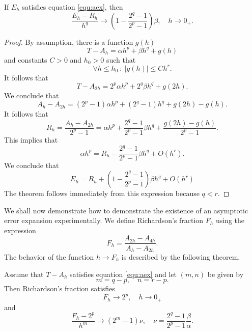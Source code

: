 \documentclass[runningheads]{llncs}
\begin{document}
\begin{theorem} If $E_h$ satisfies equation \eqref{equ:aex}, then
  \begin{equation}
    \frac{E_h - R_h}{h^q} \rightarrow  \left(1 - \frac{2^q-1}{2^p-1} \right) \beta, \quad h \rightarrow 0_+.
  \end{equation}
\end{theorem}
\begin{proof}
  By assumption, there is a function $g(h)$ 
  \begin{equation}
    T - A_h  = \alpha h^p + \beta h^q + g(h)
  \end{equation}
  and constants $C>0$ and $h_0 > 0$ such that
  \begin{equation}
    \forall h \leq h_0 \: : \: |g(h)| \leq Ch^r.
  \end{equation}
  It follows that
  \begin{equation}
    T- A_{2h} = 2^p \alpha h^p + 2^q \beta h^q + g(2h).
  \end{equation}
  We conclude that
  \begin{equation} \label{equ:Dh:1}
    A_h - A_{2h} = (2^p - 1) \alpha h^p + (2^q - 1) h^q + g(2h) - g(h).
  \end{equation}
  It follows that
  \begin{equation}
    R_h = \frac{A_h - A_{2h}}{2^p - 1} = \alpha h^p + \frac{2^q-1}{2^p-1} \beta h^q + \frac{g(2h)-g(h)}{2^p-1}.
  \end{equation}
 This implies that
  \begin{equation}
    \alpha h^p =  R_h - \frac{2^q-1}{2^p-1} \beta h^q + O(h^r).
  \end{equation}
  We conclude that
  \begin{equation}
    E_h = R_h + \left(1 - \frac{2^q-1}{2^p-1} \right) \beta h^q + O(h^r)
  \end{equation}
  The theorem follows immediately from this expression because $q < r$.
\end{proof}
We shall now demonstrate how to demonstrate the existence of an asymptotic error expansion experimentally.
We define Richardson's fraction $F_h$ using the expression
\begin{equation}
  F_h = \frac{A_{2h} - A_{4h}}{A_h - A_{2h}}.
\end{equation}
The behavior of the function $h \rightarrow F_h$ is described by the following theorem.
\begin{theorem} Assume that $T-A_h$ satisfies equation \eqref{equ:aex} and let $(m,n)$ be given by
  \begin{equation}
    m = q - p, \quad n = r - p.
  \end{equation}
  Then Richardson's fraction satisfies
  \begin{equation}
    F_h \rightarrow 2^p, \quad h \rightarrow 0_+
  \end{equation}
  and 
  \begin{equation}
    \frac{F_h - 2^p}{h^m} \rightarrow (2^m-1) \nu, \quad \nu = \frac{2^q-1}{2^p-1} \frac{\beta}{\alpha}.
    \end{equation}
\end{theorem}
\end{document}
